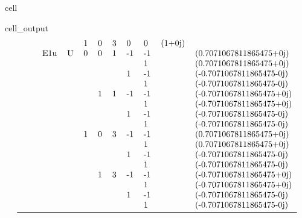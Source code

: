 \documentclass[letterpaper,table,10pt,english]{jupyterBook}
\begin{document}
\begin{sphinxuseclass}{cell}
\begin{sphinxVerbatimOutput}
\begin{sphinxuseclass}{cell_output}
\begin{equation*}
\begin{split}
\begin{tabular}{lllllllllll}
  &     &     &   & 1 & 0 & 3 &  0 &  0 &  (1+0j) &                           \\
  &     & E1u & U & 0 & 0 & 1 & -1 & -1 &         &   (0.7071067811865475+0j) \\
  &     &     &   &   &   &   &    &  1 &         &   (0.7071067811865475+0j) \\
  &     &     &   &   &   &   &  1 & -1 &         &  (-0.7071067811865475-0j) \\
  &     &     &   &   &   &   &    &  1 &         &  (-0.7071067811865475-0j) \\
  &     &     &   &   & 1 & 1 & -1 & -1 &         &  (-0.7071067811865475+0j) \\
  &     &     &   &   &   &   &    &  1 &         &  (-0.7071067811865475+0j) \\
  &     &     &   &   &   &   &  1 & -1 &         &  (-0.7071067811865475-0j) \\
  &     &     &   &   &   &   &    &  1 &         &  (-0.7071067811865475-0j) \\
  &     &     &   & 1 & 0 & 3 & -1 & -1 &         &   (0.7071067811865475+0j) \\
  &     &     &   &   &   &   &    &  1 &         &   (0.7071067811865475+0j) \\
  &     &     &   &   &   &   &  1 & -1 &         &  (-0.7071067811865475-0j) \\
  &     &     &   &   &   &   &    &  1 &         &  (-0.7071067811865475-0j) \\
  &     &     &   &   & 1 & 3 & -1 & -1 &         &  (-0.7071067811865475+0j) \\
  &     &     &   &   &   &   &    &  1 &         &  (-0.7071067811865475+0j) \\
  &     &     &   &   &   &   &  1 & -1 &         &  (-0.7071067811865475-0j) \\
  &     &     &   &   &   &   &    &  1 &         &  (-0.7071067811865475-0j) \\
\bottomrule
\end{tabular}\end{split}
\end{equation*}
\end{sphinxuseclass}\end{sphinxVerbatimOutput}

\end{sphinxuseclass}
\end{document}

